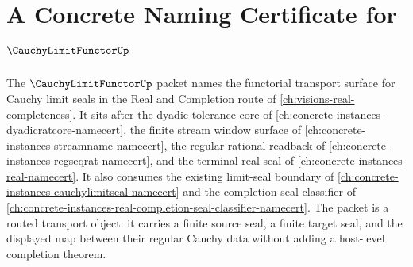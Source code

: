 \chapter{A Concrete Naming Certificate for $\CauchyLimitFunctorUp$}
\label{ch:concrete-instances-cauchy-limit-functor-namecert}

The $\CauchyLimitFunctorUp$ packet names the functorial transport surface for Cauchy limit seals in the Real and Completion route of \autoref{ch:visions-real-completeness}. It sits after the dyadic tolerance core of \autoref{ch:concrete-instances-dyadicratcore-namecert}, the finite stream window surface of \autoref{ch:concrete-instances-streamname-namecert}, the regular rational readback of \autoref{ch:concrete-instances-regseqrat-namecert}, and the terminal real seal of \autoref{ch:concrete-instances-real-namecert}. It also consumes the existing limit-seal boundary of \autoref{ch:concrete-instances-cauchylimitseal-namecert} and the completion-seal classifier of \autoref{ch:concrete-instances-real-completion-seal-classifier-namecert}. The packet is a routed transport object: it carries a finite source seal, a finite target seal, and the displayed map between their regular Cauchy data without adding a host-level completion theorem.



